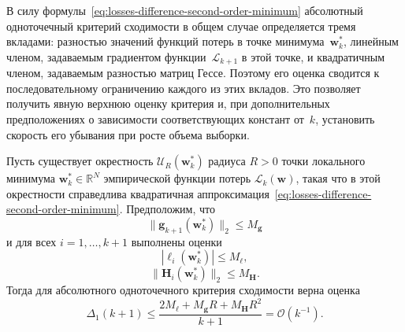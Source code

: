 В силу формулы~\eqref{eq:losses-difference-second-order-minimum} абсолютный одноточечный критерий сходимости в общем случае определяется тремя вкладами: разностью значений функций потерь в точке минимума~$\mathbf w_k^*$, линейным членом, задаваемым градиентом функции~$\mathcal L_{k+1}$ в этой точке, и квадратичным членом, задаваемым разностью матриц Гессе. Поэтому его оценка сводится к последовательному ограничению каждого из этих вкладов. Это позволяет получить явную верхнюю оценку критерия и, при дополнительных предположениях о зависимости соответствующих констант от~$k$, установить скорость его убывания при росте объема выборки.

\begin{theorem}
    \label{thm:abs-onepoint-general}
    Пусть существует окрестность $\mathcal U_R(\mathbf w_k^*)$ радиуса $R>0$
    точки локального минимума $\mathbf w_k^* \in \mathbb R^N$ эмпирической
    функции потерь $\mathcal L_k(\mathbf w)$, такая что в этой окрестности
    справедлива квадратичная аппроксимация~\eqref{eq:losses-difference-second-order-minimum}.
    Предположим, что
    \begin{equation}
        \label{eq:abs-onepoint-thm-ass-grad}
        \|\mathbf g_{k+1}(\mathbf w_k^*)\|_2 \leqslant M_{\mathbf g}
    \end{equation}
    и для всех $i=1, \ldots, k+1$ выполнены оценки
    \begin{equation}
        \label{eq:abs-onepoint-thm-ass-loss}
        |\ell_i(\mathbf w_k^*)| \leqslant M_\ell,
    \end{equation}
    \begin{equation}
        \label{eq:abs-onepoint-thm-ass-hess}
        \|\mathbf H_i(\mathbf w_k^*)\|_2 \leqslant M_{\mathbf H}.
    \end{equation}
    Тогда для абсолютного одноточечного критерия сходимости верна оценка
    \begin{equation}
        \label{eq:abs-onepoint-general-theorem}
        \Delta_1(k+1)
        \leqslant
        \frac{2M_\ell + M_{\mathbf g}R + M_{\mathbf H}R^2}{k+1}
        = \mathcal{O}(k^{-1}).
    \end{equation}
\end{theorem}


